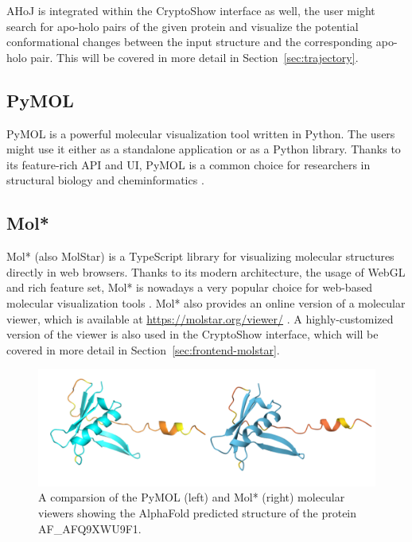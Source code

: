 AHoJ is integrated within the CryptoShow interface as well, the user might search for apo-holo pairs of the given protein and visualize the potential conformational changes between the input structure and the corresponding apo-holo pair. This will be covered in more detail in Section~\ref{sec:trajectory}.

\subsection{PyMOL}
\label{sec:pymol}

PyMOL is a powerful molecular visualization tool written in Python. The users might use it either as a standalone application or as a Python library. Thanks to its feature-rich API and UI, PyMOL is a common choice for researchers in structural biology and cheminformatics \cite{delano2002pymol}.

\subsection{Mol*}
\label{sec:molstar}

Mol* (also MolStar) is a TypeScript library for visualizing molecular structures directly in web browsers. Thanks to its modern architecture, the usage of WebGL and rich feature set, Mol* is nowadays a very popular choice for web-based molecular visualization tools \cite{sehnal2018mol}. Mol* also provides an online version of a molecular viewer, which is available at \url{https://molstar.org/viewer/} \cite{sehnal2021mol}. A highly-customized version of the viewer is also used in the CryptoShow interface, which will be covered in more detail in Section~\ref{sec:frontend-molstar}.

\begin{figure}[ht]
    \centering
    \includegraphics[width=\textwidth]{img/pymol-molstar.png}
    \caption{A comparsion of the PyMOL (left) and Mol* (right) molecular viewers showing the AlphaFold predicted structure of the protein AF\_AFQ9XWU9F1.}
    \label{fig:pymol-molstar}
\end{figure}

